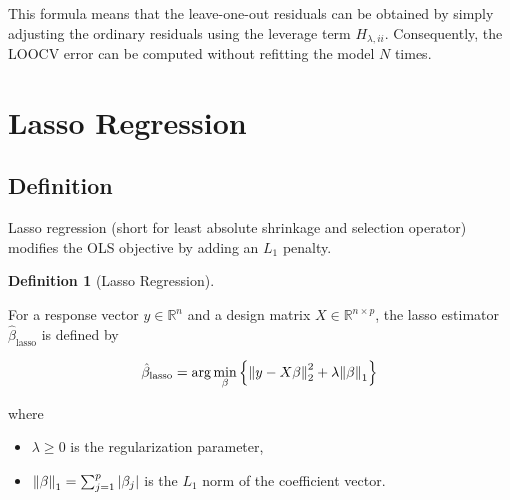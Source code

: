 \documentclass[
  letterpaper,
  DIV=11,
  numbers=noendperiod]{scrreprt}
\providecommand{\tightlist}{%
  \setlength{\itemsep}{0pt}\setlength{\parskip}{0pt}}
\newcommand{\lasso}{\mathrm{lasso}}
\theoremstyle{definition}
\newtheorem{definition}{Definition}[chapter]
\theoremstyle{definition}
\theoremstyle{plain}
\theoremstyle{plain}
\theoremstyle{remark}
\begin{document}
\begin{tcolorbox}[enhanced jigsaw, arc=.35mm, bottomrule=.15mm, bottomtitle=1mm, breakable, colback=white, colbacktitle=quarto-callout-note-color!10!white, colframe=quarto-callout-note-color-frame, coltitle=black, left=2mm, leftrule=.75mm, opacityback=0, opacitybacktitle=0.6, rightrule=.15mm, title=\textcolor{quarto-callout-note-color}{\faInfo}\hspace{0.5em}{Note}, titlerule=0mm, toprule=.15mm, toptitle=1mm]

This formula means that the leave-one-out residuals can be obtained by
simply adjusting the ordinary residuals using the leverage term
\(H_{\lambda,ii}\). Consequently, the LOOCV error can be computed
without refitting the model \(N\) times.

\end{tcolorbox}

\section{Lasso Regression}\label{lasso-regression}

\subsection{Definition}\label{definition}

Lasso regression (short for least absolute shrinkage and selection
operator) modifies the OLS objective by adding an \(L_1\) penalty.

\begin{definition}[Lasso
Regression]\protect\hypertarget{def-lasso}{}\label{def-lasso}

For a response vector \(y \in \mathbb{R}^n\) and a design matrix
\(X \in \mathbb{R}^{n \times p}\), the lasso estimator
\(\hat{\beta}_{\lasso}\) is defined by

\[
\hat{\beta}_{\lasso}
=
\arg\min_{\beta}
\qty{
\norm{y-X\beta}_2^2 + \lambda \norm{\beta}_1
}
\]

where

\begin{itemize}
\tightlist
\item
  \(\lambda \ge 0\) is the regularization parameter,
\item
  \(\norm{\beta}_1 = \sum_{j=1}^p |\beta_j|\) is the \(L_1\) norm of the
  coefficient vector.
\end{itemize}

\end{definition}
\end{document}
